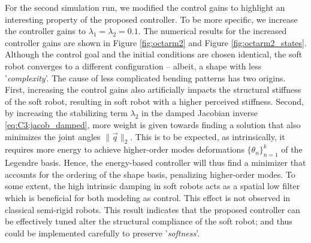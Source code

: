 \begin{example}
For the second simulation run, we modified the control gains to highlight an interesting property of the proposed controller. To be more specific, we increase the controller gains to $\lambda_1 = \lambda_2 = 0.1$. The numerical results for the increased controller gains are shown in Figure \ref{fig:octarm2} and Figure \ref{fig:octarm2_states}. Although the control goal and the initial conditions are chosen identical, the soft robot converges to a different configuration -- albeit, a shape with less '\textit{complexity}'. The cause of less complicated bending patterns has two origins. First, increasing the control gains also artificially impacts the structural stiffness of the soft robot, resulting in soft robot with a higher perceived stiffness. Second, by increasing the stabilizing term $\lambda_2$ in the damped Jacobian inverse \eqref{eq:C3:jacob_damped}, more weight is given towards finding a solution that also minimizes the joint angles $\lVert \vec{q} \rVert_2 $.  This is to be expected, as intrinsically, it requires more energy to achieve higher-order modes deformations $\{\theta_n\}_{n=1}^k$ of the Legendre basis. Hence, the energy-based controller will thus find a minimizer that accounts for the ordering of the shape basis, penalizing higher-order modes. To some extent, the high intrinsic damping in soft robots acts as a spatial low filter which is beneficial for both modeling as control. This effect is not observed in classical semi-rigid robots.  This result indicates that the proposed controller can be effectively tuned alter the structural compliance of the soft robot; and thus could be implemented carefully to preserve '\textit{softness}'. 
\end{example}


